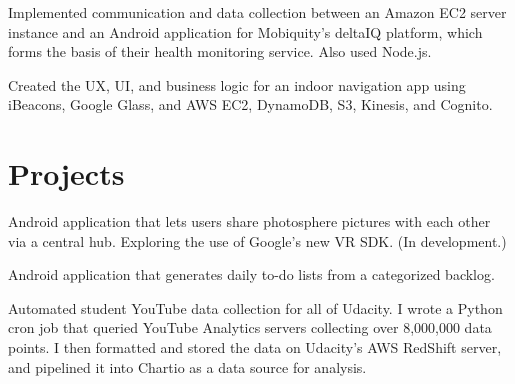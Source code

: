 \documentclass[]{deedy-resume-openfont}
\begin{document}
\begin{minipage}[t]{0.66\textwidth}
\begin{tightemize}
\item Implemented communication and data collection between an Amazon EC2 server instance and an Android application for Mobiquity’s deltaIQ platform, which forms the basis of their health monitoring service. Also used Node.js.

\item Created the UX, UI, and business logic for an indoor navigation app using iBeacons, Google Glass, and AWS EC2, DynamoDB, S3, Kinesis, and Cognito.
\end{tightemize}


\section{Projects}

\begin{tightemize}
\item Android application that lets users share photosphere pictures with each other via a central hub. Exploring the use of Google's new VR SDK. (In development.)
\end{tightemize}
\sectionsep

\begin{tightemize}
\item Android application that generates daily to-do lists from a categorized backlog.
\end{tightemize}
\sectionsep


\begin{tightemize}
\item Automated student YouTube data collection for all of Udacity. I wrote a Python cron job that queried YouTube Analytics servers collecting over 8,000,000 data points. I then formatted and stored the data on Udacity's AWS RedShift server, and pipelined it into Chartio as a data source for analysis.
\end{tightemize}
\sectionsep



\end{minipage}
\end{document}
